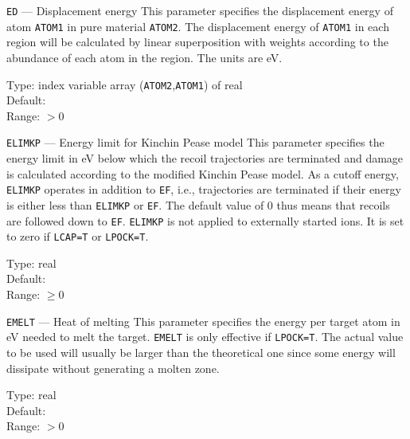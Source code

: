 \begin{keydescription}{\texttt{ED} --- Displacement energy}
%
  This parameter specifies the displacement energy of atom
  \texttt{ATOM1} in pure material \texttt{ATOM2}.  The displacement energy
  of \texttt{ATOM1} in each region will be calculated by linear superposition
  with weights according to the abundance of each atom in the region. The
  units are eV. 
  \begin{keytab}
    Type:    \> index variable array (\texttt{ATOM2},\texttt{ATOM1}) 
                of real \\
    Default:  \\
    Range:   \> $> 0$
  \end{keytab}
\end{keydescription}

\begin{keydescription}{\texttt{ELIMKP} --- Energy limit for Kinchin
    Pease model} 
%
  This parameter specifies the energy limit in eV below which the
  recoil trajectories are terminated and damage is calculated according to the 
  modified Kinchin Pease model. As a cutoff energy, \texttt{ELIMKP} operates 
  in addition to \texttt{EF},
  i.e., trajectories are terminated if their energy is either less than 
  \texttt{ELIMKP} or \texttt{EF}. The default value of 0 thus means that 
  recoils are followed down to \texttt{EF}. \texttt{ELIMKP} is not applied to 
  externally started ions. It is set to zero if \texttt{LCAP=T} or 
  \texttt{LPOCK=T}. 
  \begin{keytab}
    Type:    \> real \\
    Default:  \\
    Range:   \> $\ge 0$
  \end{keytab}
\end{keydescription}

\begin{keydescription}{\texttt{EMELT} --- Heat of melting}
%
  This parameter specifies the energy per target atom in eV needed to
  melt the target. \texttt{EMELT} is only effective if
  \texttt{LPOCK=T}. The actual value to be used will usually be larger
  than the theoretical one since some energy will dissipate without
  generating a molten zone.
  \begin{keytab}
    Type:    \> real \\
    Default:  \\
    Range:   \> $> 0$
  \end{keytab}
\end{keydescription}

